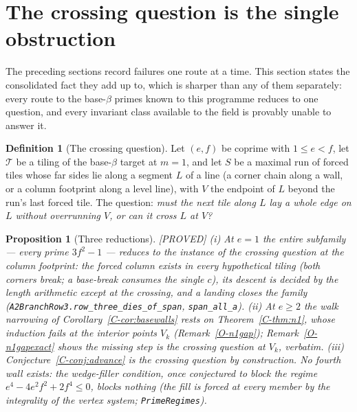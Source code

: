 \documentclass[11pt,reqno]{amsart}
\theoremstyle{plain}
\newtheorem{proposition}[theorem]{Proposition}
\theoremstyle{definition}
\newtheorem{definition}[theorem]{Definition}
\newcommand{\lab}[1]{\hfill\textnormal{\footnotesize\textsc{[#1]}}}
\begin{document}
\section{The crossing question is the single obstruction}\label{sec:onewall}

The preceding sections record failures one route at a time. This section states the consolidated
fact they add up to, which is sharper than any of them separately: every route to the base-$\beta$
primes known to this programme reduces to one question, and every invariant class available to the
field is provably unable to answer it.

\begin{definition}[The crossing question]\label{def:crossQ}
Let $(e,f)$ be coprime with $1\le e<f$, let $\mathcal T$ be a tiling of the base-$\beta$ target at
$m=1$, and let $S$ be a maximal run of forced tiles whose far sides lie along a segment $L$ of a
line (a corner chain along a wall, or a column footprint along a level line), with $V$ the endpoint
of $L$ beyond the run's last forced tile. The question: \emph{must the next tile along $L$ lay a
whole edge on $L$ without overrunning $V$, or can it cross $L$ at $V$?}
\end{definition}

\begin{proposition}[Three reductions]\label{prop:threecostumes}\lab{PROVED}
\emph{(i)} At $e=1$ the entire subfamily --- every prime $3f^2-1$ --- reduces to the instance of the
crossing question at the column footprint: the forced column exists in every hypothetical tiling
(both corners break; a base-break consumes the single $c$), its descent is decided by the length
arithmetic except at the crossing, and a landing closes the family
(\texttt{A2BranchRow3.row\_three\_dies\_of\_span}, \texttt{span\_all\_a}).
\emph{(ii)} At $e\ge2$ the walk narrowing of Corollary~\ref{C-cor:basewalls} rests on
Theorem~\ref{C-thm:n1}, whose induction fails at the interior points $V_k$
(Remark~\ref{O-n1gap}); Remark~\ref{O-n1gapexact} shows the missing step \emph{is} the crossing
question at $V_k$, verbatim.
\emph{(iii)} Conjecture~\ref{C-conj:advance} is the crossing question by construction.
No fourth wall exists: the wedge-filler condition, once conjectured to block the regime
$e^4-4e^2f^2+2f^4\le0$, blocks nothing (the fill is forced at every member by the integrality of the
vertex system; \texttt{PrimeRegimes}).
\end{proposition}
\end{document}
